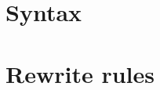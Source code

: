 \documentclass[acmsmall,review]{acmart}\settopmatter{printfolios=true,printccs=false,printacmref=false,authorsperrow=2}
\begin{document}
\maketitle
\renewcommand{\shortauthors}{Augustsson, Breitner, Claessen, Jhala, Peyton Jones, Shivers, Steele, Sweeney}



\section{Syntax}


\figureSyntax


\section{Rewrite rules} \label{sec:rewrite-rules}

\figureRewriteRules
\figureContexts
\end{document}
